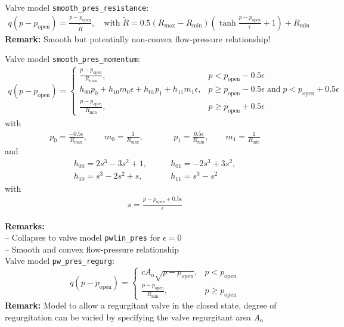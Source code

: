 \documentclass[a4paper,12pt]{report}
\begin{document}
Valve model \verb.smooth_pres_resistance.:
\begin{align}
q(p-p_{\mathrm{open}}) = \frac{p-p_{\mathrm{open}}}{\tilde{R}},\quad \text{with}\;\tilde{R} = 0.5\left(R_{\max}-R_{\min}\right)\left(\tanh\frac{p-p_{\mathrm{open}}}{\epsilon}+1\right) + R_{\min}\nonumber
\end{align}
\textbf{Remark:} Smooth but potentially non-convex flow-pressure relationship!

Valve model \verb"smooth_pres_momentum":
\begin{align}
q(p-p_{\mathrm{open}}) = \begin{cases}\frac{p-p_{\mathrm{open}}}{R_{\max}}, & p < p_{\mathrm{open}}-0.5\epsilon \\ h_{00}p_{0} + h_{10}m_{0}\epsilon + h_{01}p_{1} + h_{11}m_{1}\epsilon, & p \geq p_{\mathrm{open}}-0.5\epsilon \;\text{and}\; p < p_{\mathrm{open}}+0.5\epsilon \\ \frac{p-p_{\mathrm{open}}}{R_{\min}}, & p \geq p_{\mathrm{open}}+0.5\epsilon  \end{cases}\nonumber
\end{align}
with
\begin{align}
p_{0}=\frac{-0.5\epsilon}{R_{\max}}, \qquad m_{0}=\frac{1}{R_{\max}}, \qquad && p_{1}=\frac{0.5\epsilon}{R_{\min}}, \qquad m_{1}=\frac{1}{R_{\min}} \nonumber
\end{align}
and
\begin{align}
h_{00}=2s^3 - 3s^2 + 1, &\qquad h_{01}=-2s^3 + 3s^2, \nonumber\\
h_{10}=s^3 - 2s^2 + s, &\qquad h_{11}=s^3 - s^2 \nonumber
\end{align}
with
\begin{align}
s=\frac{p-p_{\mathrm{open}}+0.5\epsilon}{\epsilon} \nonumber
\end{align}

\textbf{Remarks:}\\
-- Collapses to valve model \verb"pwlin_pres" for $\epsilon=0$\\
-- Smooth and convex flow-pressure relationship\\

Valve model \verb"pw_pres_regurg":
\begin{equation}
q(p-p_{\mathrm{open}}) = \begin{cases} c A_{\mathrm{o}} \sqrt{p-p_{\mathrm{open}}}, & p < p_{\mathrm{open}} \\ \frac{p-p_{\mathrm{open}}}{R_{\min}}, & p \geq p_{\mathrm{open}}  \end{cases}\nonumber
\end{equation}
\textbf{Remark:} Model to allow a regurgitant valve in the closed state, degree of regurgitation can be varied by specifying the valve regurgitant area $A_{\mathrm{o}}$
\end{document}
